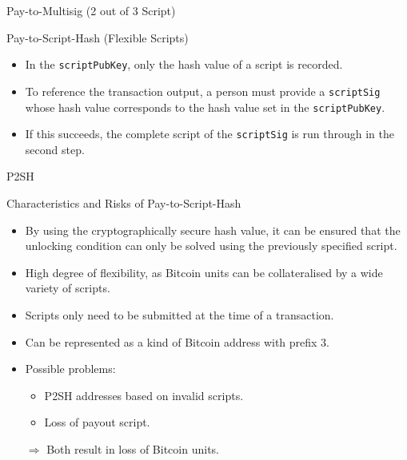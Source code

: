 \documentclass[]{beamer}
\begin{document}
\begin{frame}{Pay-to-Multisig (2 out of 3 Script)}
\centering

\end{frame}


\begin{frame}{Pay-to-Script-Hash (Flexible Scripts)}
  \vspace{1em}
\begin{itemize}
  \item<1-> In the \texttt{scriptPubKey}, only the hash value of a script is recorded.
  \item<2-> To reference the transaction output, a person must provide a \texttt{scriptSig} whose hash value corresponds to the hash value set in the \texttt{scriptPubKey}.
  \item<3-> If this succeeds, the complete script of the \texttt{scriptSig} is run through in the second step.
\end{itemize}
\end{frame}


\begin{frame}{P2SH}
\centering
\begin{figure}
	
\end{figure}
\end{frame}


\begin{frame}{Characteristics and Risks of Pay-to-Script-Hash}
\begin{itemize}
	\item<1-> By using the cryptographically secure hash value, it can be ensured that the unlocking condition can only be solved using the previously specified script.
	\item<2-> High degree of flexibility, as Bitcoin units can be collateralised by a wide variety of scripts.
	\item<3-> Scripts only need to be submitted at the time of a transaction. %
	\item<4-> Can be represented as a kind of Bitcoin address with prefix 3. %
	\vspace{1em}
	\item<5-> Possible problems: 
	\begin{itemize}
  \item<5-> P2SH addresses based on invalid scripts.
  \item<5-> Loss of payout script.
\end{itemize}\vspace{0.5em}
$\Rightarrow$ Both result in loss of Bitcoin units.
\end{itemize}
\end{frame}
\end{document}
